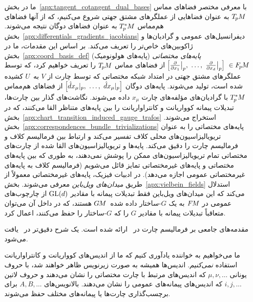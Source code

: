 ما در بخش~\ref{apx:tangent_cotangent_dual_bases} با معرفی مختصر فضاهای مماس $T_{\mkern-1.5mu p}\mkern-.5muM$ به عنوان فضاهایی از عملگرهای مشتق جهتی شروع می‌کنیم، که از آنها فضاهای هم‌مماس $T_{\mkern-1.5mu p}^{\mkern-0mu *}\mkern-1muM$ به عنوان فضاهای دوگان نتیجه می‌شوند.
بخش~\ref{apx:differentials_gradients_jacobians} دیفرانسیل‌های عمومی و گرادیان‌ها و ژاکوبین‌های خاص‌تر را تعریف می‌کند.
بر اساس این مقدمات، ما در بخش~\ref{apx:coord_basis_def} \emph{پایه‌های مختصاتی} (پایه‌های هولونومیک)
${\pig[ \frac{\partial}{\partial x_1}\big|_p, \ \dots,\ \frac{\partial}{\partial x_d}\big|_p \pig]\ \in \FpM}$
از فضاهای مماس $T_{\mkern-1.5mu p}\mkern-.5muM$ را تعریف خواهیم کرد، که توسط عملگرهای مشتق جهتی در امتداد شبکه مختصاتی که توسط چارت از $V$ به~$U$ کشیده شده است، تولید می‌شوند.
پایه‌های دوگان
${\pig[ \hat{d}x_\mu|_p, \ \dots,\ \hat{d}x_\mu|_p \pig]}$
از فضاهای هم‌مماس $T_{\mkern-1.5mu p}^{\mkern-0mu *}\mkern-1muM$ با گرادیان‌های مؤلفه‌های چارت $x_\mu$ داده می‌شوند.
نگاشت‌های گذار بین چارت‌ها، تبدیلات پیمانه کوواریانت و کانتراواریانت را بین پایه‌های متناظر القا می‌کنند، که در بخش~\ref{apx:chart_transition_induced_gauge_trafos} استخراج می‌شوند.
بخش~\ref{apx:correspondences_bundle_trivializations} پایه‌های مختصاتی را به عنوان تریویالیزاسیون‌های محلی کلاف تفسیر می‌کند و ارتباط بین فرمالیسم کلاف و فرمالیسم چارت را دقیق می‌کند.
پایه‌ها و تریویالیزاسیون‌های القا شده از چارت‌های مختصاتی تمام تریویالیزاسیون‌های ممکن را پوشش نمی‌دهند، به طوری که بین پایه‌های مختصاتی و پایه‌های غیرمختصاتی تمایز قائل می‌شویم (فرمالیسم کلاف به پایه‌های غیرمختصاتی عمومی اجازه می‌دهد).
در ادبیات فیزیک، پایه‌های غیرمختصاتی معمولاً از طریق \emph{میدان‌های ویل‌باین} معرفی می‌شوند.
بخش~\ref{apx:vielbein_fields} استدلال می‌کند که این میدان‌های ویل‌باین فقط تبدیلات پیمانه با مقادیر $\operatorname{GL}(d)$ از چارچوب‌های عمومی در $F\mkern-1.5muM$ به یک $G$-ساختار داده شده~$G\mkern-1.4muM$ هستند، که در داخل آن می‌توان متعاقباً تبدیلات پیمانه با مقادیر $G$ را که $G$-ساختار را حفظ می‌کنند، اعمال کرد.

مقدمه‌های جامعی بر فرمالیسم چارت در~\cite{nakahara2003geometry,schullerGeometricalAnatomy2016,carroll2004spacetime} ارائه شده است.
یک شرح دقیق‌تر در~\cite{schullerGeometricalAnatomy2016} یافت می‌شود.

ما می‌خواهیم به خواننده یادآوری کنیم که ما از اندیس‌های کوواریانت و کانتراواریانت استفاده \emph{نمی‌کنیم}.
اندیس‌ها همیشه به صورت زیرنویس ظاهر خواهند شد، با حروف یونانی $\mu,\nu,\dots$ که اندیس‌های مرتبط با چارت مختصاتی را نشان می‌دهند و حروف لاتین $i,j,\dots$ که اندیس‌های پیمانه‌های عمومی را نشان می‌دهند.
بالانویس‌های $A,B,\dots$ برای برچسب‌گذاری چارت‌ها یا پیمانه‌های مختلف حفظ می‌شوند.











